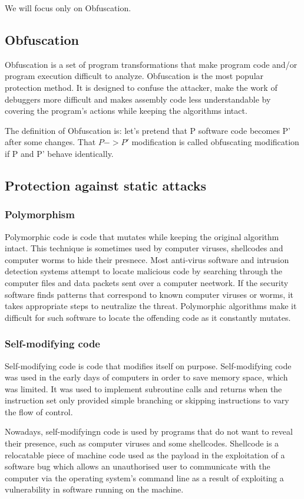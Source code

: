 \documentclass[a4paper,12pt]{article}
\begin{document}
We will focus only on Obfuscation.

\subsection{Obfuscation}
Obfuscation is a set of program transformations
that make program code and/or program execution difficult to analyze.
Obfuscation is the most popular protection method. It is designed to confuse
the attacker, make the work of debuggers more difficult and makes assembly
code less understandable by covering the program's actions while keeping the
algorithms intact.

The definition of Obfuscation is: let's pretend that P software code becomes
P' after some changes. That $P -> P'$ modification is called
obfuscating modification if P and P' behave identically.

\subsection{Protection against static attacks}
\subsubsection{Polymorphism}
    Polymorphic code is code that mutates while keeping the original algorithm
    intact. This technique is sometimes used by computer viruses, shellcodes
    and computer worms to hide their presnece. Most anti-virus software and
    intrusion detection systems attempt to locate malicious code by searching
    through the computer files and data packets sent over a computer neetwork.
    If the security software finds patterns that correspond to known computer
    viruses or worms, it takes appropriate steps to neutralize the threat.
    Polymorphic algorithms make it difficult for such software to locate the
    offending code as it constantly mutates.

\subsubsection{Self-modifying code}
    Self-modifying code is code that modifies itself on purpose.
    Self-modifying code was used in the early days of computers in order to
    save memory space, which was limited. It was  used to implement subroutine
    calls and returns when the instruction set only provided simple branching
    or skipping instructions to vary the flow of control.

    Nowadays, self-modifyingn code is used by programs that do not want to
    reveal their presence, such as computer viruses and some shellcodes.
    Shellcode is a relocatable piece of machine code used as the payload in
    the exploitation of a software bug which allows an unauthorised user to
    communicate with the computer via the operating system's command line
    as a result of exploiting a vulnerability in software running on the
    machine.
\end{document}
